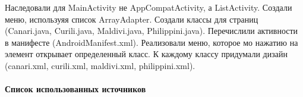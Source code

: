 \documentclass[12pt, a4paper, simple]{eskdtext}
\begin{document}
    Наследовали для MainActivity не AppCompatActivity, а ListActivity.
    Создали меню, используяя список ArrayAdapter.
    Создали классы для страниц (Canari.java, Curili.java, Maldivi.java, Philippini.java).
    Перечислили активности в манифесте (AndroidManifest.xml).
    Реализовали меню, которое мо нажатию на элемент открывает определенный класс.
    К каждому классу придумали дизайн (canari.xml, curili.xml, maldivi.xml, philippini.xml).

    \paragraph{} \textbf{Список использованных источников}
\end{document}
